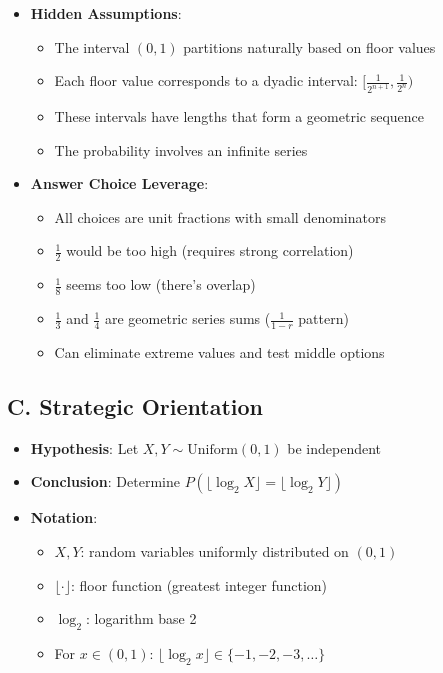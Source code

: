 \documentclass[11pt]{article}
\begin{document}
\begin{problemconfigbox}
\begin{itemize}[leftmargin=*]
    \item \textbf{Hidden Assumptions}: 
    \begin{itemize}
        \item The interval $(0,1)$ partitions naturally based on floor values
        \item Each floor value corresponds to a dyadic interval: $[\frac{1}{2^{n+1}}, \frac{1}{2^n})$
        \item These intervals have lengths that form a geometric sequence
        \item The probability involves an infinite series
    \end{itemize}
    
    \item \textbf{Answer Choice Leverage}: 
    \begin{itemize}
        \item All choices are unit fractions with small denominators
        \item $\frac{1}{2}$ would be too high (requires strong correlation)
        \item $\frac{1}{8}$ seems too low (there's overlap)
        \item $\frac{1}{3}$ and $\frac{1}{4}$ are geometric series sums ($\frac{1}{1-r}$ pattern)
        \item Can eliminate extreme values and test middle options
    \end{itemize}
\end{itemize}

\subsection*{C. Strategic Orientation}
\begin{itemize}[leftmargin=*]
    \item \textbf{Hypothesis}: Let $X, Y \sim \text{Uniform}(0,1)$ be independent
    
    \item \textbf{Conclusion}: Determine $P(\lfloor\log_2 X\rfloor = \lfloor\log_2 Y\rfloor)$
    
    \item \textbf{Notation}: 
    \begin{itemize}
        \item $X, Y$: random variables uniformly distributed on $(0,1)$
        \item $\lfloor \cdot \rfloor$: floor function (greatest integer function)
        \item $\log_2$: logarithm base 2
        \item For $x \in (0,1)$: $\lfloor\log_2 x\rfloor \in \{-1, -2, -3, \ldots\}$
    \end{itemize}
    

\end{itemize}
\end{problemconfigbox}
\end{document}
